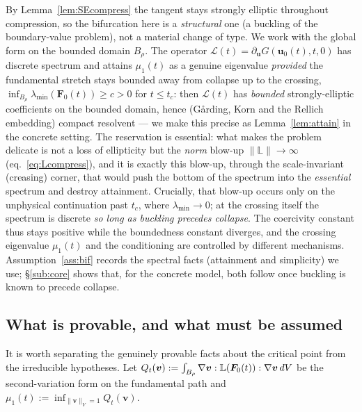 \begin{remark}
    \label{rem:framework}
    By Lemma~\ref{lem:SEcompress} the tangent stays strongly elliptic throughout compression, so the bifurcation here is
    a \emph{structural} one (a buckling of the boundary-value problem), not a material change of type. We work with the
    global form on the bounded domain $B_\rho$. The operator $\mathcal{L}(t)=\partial_{\bm{u}}G(\bm{u}_0(t),t,0)$ has
    discrete spectrum and attains $\mu_1(t)$ as a genuine eigenvalue \emph{provided} the fundamental stretch stays
    bounded away from collapse up to the crossing, $\inf_{B_\rho}\lambda_{\min}(\bm{F}_0(t))\ge c>0$ for $t\le t_c$: then
    $\mathcal{L}(t)$ has \emph{bounded} strongly-elliptic coefficients on the bounded domain, hence (G\aa rding, Korn and
    the Rellich embedding) compact resolvent --- we make this precise as Lemma~\ref{lem:attain} in the concrete setting.
    The reservation is essential: what makes the problem delicate is not a loss of ellipticity but the \emph{norm}
    blow-up $\|\mathbb{L}\|\to\infty$ (eq.~\eqref{eq:Lcompress}), and it is exactly this blow-up, through the
    scale-invariant (creasing) corner, that would push the bottom of the spectrum into the \emph{essential} spectrum and
    destroy attainment. Crucially, that blow-up occurs only on the unphysical continuation past $t_c$, where
    $\lambda_{\min}\to0$; at the crossing itself the spectrum is discrete \emph{so long as buckling precedes collapse}.
    The coercivity constant thus stays positive while the boundedness constant diverges, and the crossing eigenvalue
    $\mu_1(t)$ and the conditioning are controlled by different mechanisms. Assumption~\ref{ass:bif} records the spectral
    facts (attainment and simplicity) we use; \S\ref{sub:core} shows that, for the concrete model, both follow once
    buckling is known to precede collapse.
\end{remark}

\subsection{What is provable, and what must be assumed}

It is worth separating the genuinely provable facts about the critical point from the irreducible hypotheses. Let
$Q_t(\bm{v}):=\int_{B_\rho}\nabla\bm{v}:\mathbb{L}(\bm{F}_0(t)):\nabla\bm{v}\,dV$ be the second-variation form on the
fundamental path and $\mu_1(t):=\inf_{\|\bm{v}\|_V=1}Q_t(\bm{v})$.

